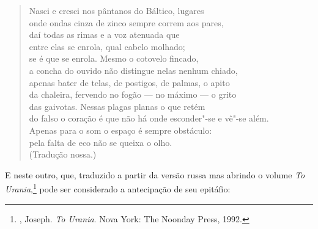 \begin{verse}
Nasci e cresci nos pântanos do Báltico, \qb{}lugares \\
onde ondas cinza de zinco sempre correm \qb{}aos pares, \\
daí todas as rimas e a voz atenuada que \\
entre elas se enrola, qual cabelo molhado; \\
se é que se enrola. Mesmo o cotovelo \qb{}fincado, \\
a concha do ouvido não distingue nelas \qb{}nenhum chiado, \\
apenas bater de telas, de postigos, \qb{}de palmas, o apito \\
da chaleira, fervendo no fogão --- no máximo \qb{}--- o grito \\
das gaivotas. Nessas plagas planas o que \qb{}retém \\
do falso o coração é que não há onde \qb{}esconder"-se e vê"-se além. \\
Apenas para o som o espaço é sempre \qb{}obstáculo: \\
pela falta de eco não se queixa o olho.\\
(Tradução nossa.)
\end{verse}

E neste outro, que, traduzido a partir da versão russa mas abrindo o 
volume \emph{To Urania},\footnote{, Joseph. 
\emph{To Urania}. Nova York: The Noonday Press, 1992.} pode ser
 considerado a antecipação de seu epitáfio:

